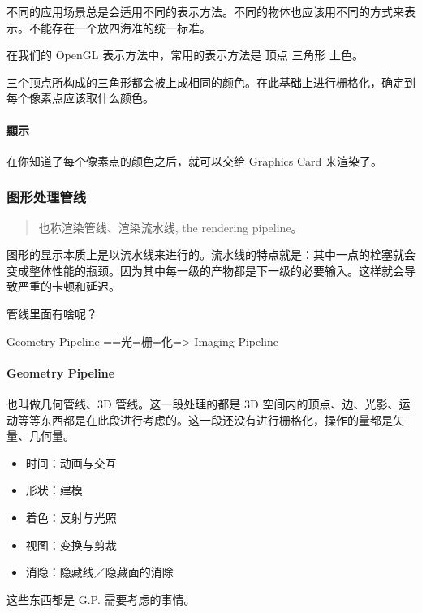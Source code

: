 \documentclass[
]{article}
\begin{document}
不同的应用场景总是会适用不同的表示方法。不同的物体也应该用不同的方式来表示。不能存在一个放四海准的统一标准。

在我们的 OpenGL 表示方法中，常用的表示方法是 顶点 三角形 上色。

三个顶点所构成的三角形都会被上成相同的颜色。在此基础上进行栅格化，确定到每个像素点应该取什么颜色。

\hypertarget{header-n158}{%
\paragraph{顯示}\label{header-n158}}

在你知道了每个像素点的颜色之后，就可以交给 Graphics Card 来渲染了。

\hypertarget{header-n160}{%
\subsubsection{图形处理管线}\label{header-n160}}

\begin{quote}
也称渲染管线、渲染流水线, the rendering pipeline。
\end{quote}

图形的显示本质上是以流水线来进行的。流水线的特点就是：其中一点的栓塞就会变成整体性能的瓶颈。因为其中每一级的产物都是下一级的必要输入。这样就会导致严重的卡顿和延迟。

管线里面有啥呢？

Geometry Pipeline ==光=栅=化=\textgreater{} Imaging Pipeline

\hypertarget{header-n166}{%
\paragraph{Geometry Pipeline}\label{header-n166}}

也叫做几何管线、3D 管线。这一段处理的都是 3D
空间内的顶点、边、光影、运动等等东西都是在此段进行考虑的。这一段还没有进行栅格化，操作的量都是矢量、几何量。

\begin{itemize}
\item
  时间：动画与交互
\item
  形状：建模
\item
  着色：反射与光照
\item
  视图：变换与剪裁
\item
  消隐：隐藏线／隐藏面的消除
\end{itemize}

这些东西都是 G.P. 需要考虑的事情。
\end{document}
